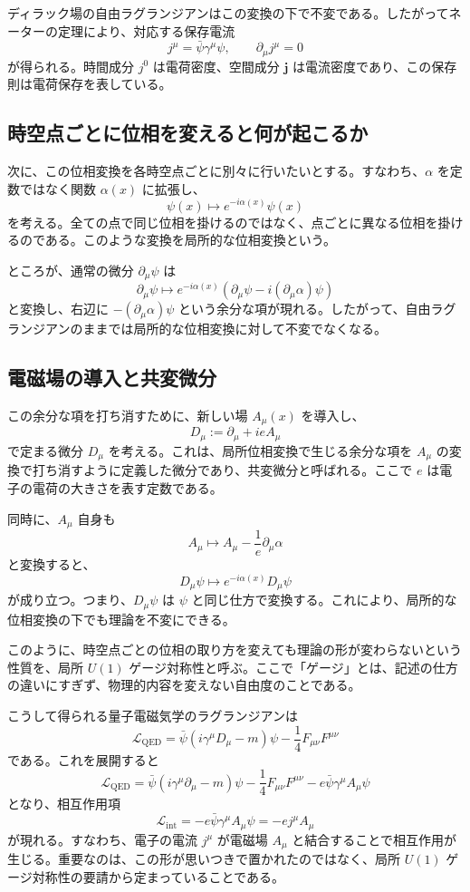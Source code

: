 ディラック場の自由ラグランジアンはこの変換の下で不変である。したがってネーターの定理により、対応する保存電流
\[
j^\mu = \bar{\psi}\gamma^\mu \psi,
\qquad
\partial_\mu j^\mu = 0
\]
が得られる。時間成分 $j^0$ は電荷密度、空間成分 $\mathbf{j}$ は電流密度であり、この保存則は電荷保存を表している。

\subsection{時空点ごとに位相を変えると何が起こるか}
次に、この位相変換を各時空点ごとに別々に行いたいとする。すなわち、$\alpha$ を定数ではなく関数 $\alpha(x)$ に拡張し、
\[
\psi(x)\mapsto e^{-i\alpha(x)}\psi(x)
\]
を考える。全ての点で同じ位相を掛けるのではなく、点ごとに異なる位相を掛けるのである。このような変換を局所的な位相変換という。

ところが、通常の微分 $\partial_\mu \psi$ は
\[
\partial_\mu \psi \mapsto e^{-i\alpha(x)}
\left(\partial_\mu \psi - i(\partial_\mu \alpha)\psi\right)
\]
と変換し、右辺に $-(\partial_\mu\alpha)\psi$ という余分な項が現れる。したがって、自由ラグランジアンのままでは局所的な位相変換に対して不変でなくなる。

\subsection{電磁場の導入と共変微分}
この余分な項を打ち消すために、新しい場 $A_\mu(x)$ を導入し、
\[
D_\mu := \partial_\mu + ieA_\mu
\]
で定まる微分 $D_\mu$ を考える。これは、局所位相変換で生じる余分な項を $A_\mu$ の変換で打ち消すように定義した微分であり、共変微分と呼ばれる。ここで $e$ は電子の電荷の大きさを表す定数である。

同時に、$A_\mu$ 自身も
\[
A_\mu \mapsto A_\mu - \frac{1}{e}\partial_\mu \alpha
\]
と変換すると、
\[
D_\mu \psi \mapsto e^{-i\alpha(x)}D_\mu \psi
\]
が成り立つ。つまり、$D_\mu\psi$ は $\psi$ と同じ仕方で変換する。これにより、局所的な位相変換の下でも理論を不変にできる。

このように、時空点ごとの位相の取り方を変えても理論の形が変わらないという性質を、局所 $U(1)$ ゲージ対称性と呼ぶ。ここで「ゲージ」とは、記述の仕方の違いにすぎず、物理的内容を変えない自由度のことである。

こうして得られる量子電磁気学のラグランジアンは
\[
\mathcal{L}_{\mathrm{QED}}
=
\bar{\psi}(i\gamma^\mu D_\mu - m)\psi
- \frac{1}{4}F_{\mu\nu}F^{\mu\nu}
\]
である。これを展開すると
\[
\mathcal{L}_{\mathrm{QED}}
=
\bar{\psi}(i\gamma^\mu \partial_\mu - m)\psi
- \frac{1}{4}F_{\mu\nu}F^{\mu\nu}
- e\bar{\psi}\gamma^\mu A_\mu \psi
\]
となり、相互作用項
\[
\mathcal{L}_{\mathrm{int}} = - e\bar{\psi}\gamma^\mu A_\mu \psi = -e j^\mu A_\mu
\]
が現れる。すなわち、電子の電流 $j^\mu$ が電磁場 $A_\mu$ と結合することで相互作用が生じる。重要なのは、この形が思いつきで置かれたのではなく、局所 $U(1)$ ゲージ対称性の要請から定まっていることである。

